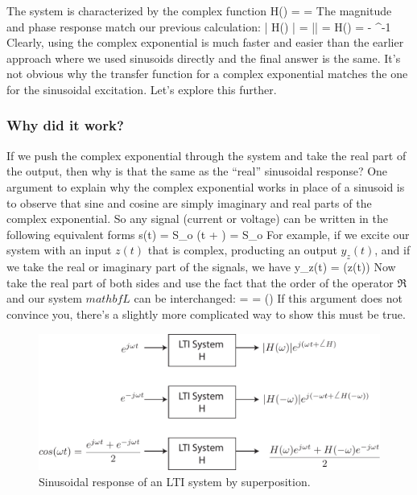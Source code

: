  The system is characterized by the complex function
\be 
	H(\omega) =  =  
\ee
 The magnitude and phase response match our previous calculation:
\be 
	| H(\omega) | = \left|\right| = 
\ee
\be 
	\angle H(\omega) = - \tan^{-1} \omega \tau 
\ee
Clearly, using the complex exponential is much faster and easier than the earlier approach where we used sinusoids directly and the final answer is the same.  It's not obvious why the transfer function for a complex exponential matches the one for the sinusoidal excitation.  Let's explore this further.


\subsubsection{Why did it work?}

If we push the complex exponential through the system and take the real part of the output, then why is that the same as the ``real'' sinusoidal response?  One argument to explain why the complex exponential works in place of a sinusoid is to observe that sine and cosine are simply imaginary and real parts of the complex exponential.  So any signal (current or voltage) can be written in the following equivalent forms
\be 
	s(t) = S_o \cos(\omega t + \phi) = S_o 
\ee
For example, if we excite our system with an input $z(t)$ that is complex, producting an output $y_z(t)$, and if we take the real or imaginary part of the signals, we have
\be
	 y_z(t) = (z(t))
\ee
Now take the real part of both sides and use the fact that the order of the operator $\Re$ and our system $mathbf{L}$ can be interchanged:
\be 
	\Re[y_z(t)] = \Re[\mathbf{L}(z(t))]  =  (\Re[z(t)]) 
\ee
If this argument does not convince you, there's a slightly more complicated way to show this must be true.



\begin{figure}[tb]
\begin{center}
\includegraphics[width=.75\columnwidth]{lti_cosine}
\end{center}
\caption{Sinusoidal response of an LTI system by superposition. } \label{fig:lti_cosine}
\end{figure}


